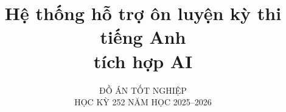 \documentclass{hcmut-thesis}
\subtitle{ĐỒ ÁN TỐT NGHIỆP\\HỌC KỲ 252 NĂM HỌC 2025--2026}
\title{Hệ thống hỗ trợ ôn luyện kỳ thi tiếng Anh \\ tích hợp AI}
\begin{document}
\renewcommand{\chaptername}{CHƯƠNG}
\renewcommand{\contentsname}{Mục lục}
\renewcommand{\listtablename}{Danh mục bảng biểu}
\renewcommand{\listfigurename}{Danh mục hình ảnh}

\hypersetup{pageanchor=false}
\coverpage%
\clearpage
\hypersetup{pageanchor=true}



\frontmatter%



%









\tableofcontents



\clearpage

\listoftables

\clearpage

\listoffigures





\mainmatter%



























\backmatter%





\nocite{*}

\clearpage
\appendix%

% 






\end{document}
